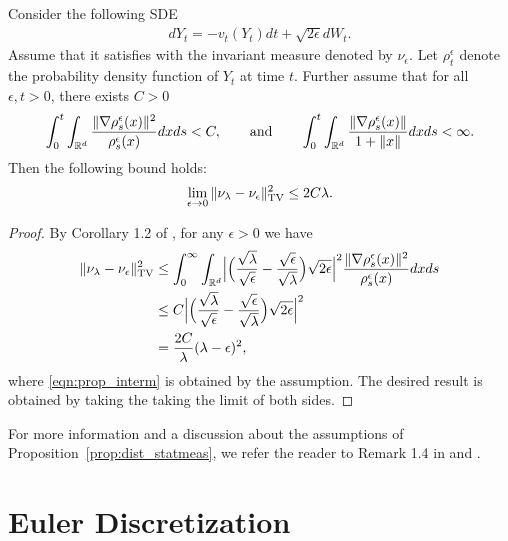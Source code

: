 \begin{prop}
\label{prop:dist_statmeas}
Consider the following SDE
\begin{align}
d Y_t = - v_t(Y_t) dt + \sqrt{2 \epsilon } d W_t. \label{eqn:sde_eps}
\end{align}
Assume that it satisfies  with the invariant measure denoted by $\nu_\epsilon$. Let $\rho^\epsilon_t$ denote the probability density function of $Y_t$ at time $t$. Further assume that for all $\epsilon,t>0$, there exists $C >0$  
\begin{align}
\int_{0}^t \int_{\mathbb{R}^d} \frac{\|\nabla \rho^\epsilon_s(x) \|^2}{\rho^\epsilon_s(x)} dx ds <C, \qquad \text{and} \qquad \int_{0}^t \int_{\mathbb{R}^d}  \frac{\|\nabla \rho^\epsilon_s(x)\|}{1+\|x\|} dx ds <\infty.
\end{align}
Then the following bound holds:
\begin{align}
\lim_{\epsilon \rightarrow 0} \| \nu_\lambda - \nu_\epsilon \|_{\textnormal{TV}}^2 \leq 2 C \lambda.
\end{align}
\end{prop}
%
\begin{proof}
By Corollary 1.2 of \cite{bogachev2016distances}, for any $\epsilon > 0$ we have 
\begin{align}
\| \nu_\lambda - \nu_\epsilon \|_{\textnormal{TV}}^2 &\leq \int_0^\infty \int_{\mathbb{R}^d} \Bigl| \Bigl(\frac{\sqrt{\lambda}}{\sqrt{\epsilon}}- \frac{\sqrt{\epsilon}}{\sqrt{\lambda}} \Bigr) \sqrt{2\epsilon}  \Bigr|^2 \frac{\|\nabla \rho^\epsilon_s(x)\|^2}{\rho^\epsilon_s(x)}  dx ds \\
&\leq  C \Bigl| \Bigl(\frac{\sqrt{\lambda}}{\sqrt{\epsilon}}- \frac{\sqrt{\epsilon}}{\sqrt{\lambda}} \Bigr) \sqrt{2\epsilon}  \Bigr|^2 \label{eqn:prop_interm} \\
&= \frac{2C}{\lambda} (\lambda - \epsilon)^2,
\end{align}
where \eqref{eqn:prop_interm} is obtained by the assumption. The desired result is obtained by taking the taking the limit of both sides. 
\end{proof}
%
\begin{remark}
For more information and a discussion about the assumptions of Proposition~\ref{prop:dist_statmeas}, we refer the reader to Remark 1.4 in \cite{bogachev2016distances} and \cite{bogachev2006global,bogachev2008estimates}.
\end{remark}


\section{Euler Discretization}




